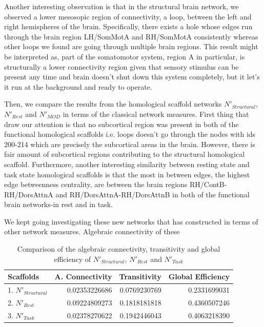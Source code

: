 \documentclass[9pt,twocolumn,twoside,lineno]{pnas-new}
\begin{document}
Another interesting observation is that in the structural brain network, we observed a lower mesosopic region of connectivity, a loop, between the left and right hemispheres of the brain. Specifically, there exists a hole whose edges run through the brain region LH/SomMotA and RH/SomMotA consistently whereas other loops we found are going through multiple brain regions. This result might be interpreted as, part of the somatomotor system, region A in particular, is structurally a lower connectivity region given that sensory stimulus can be present any time and brain doesn't shut down this system completely, but it let's it run at the background and ready to operate.

Then, we compare the results from the homological scaffold networks $N'_{Structural}$, $N'_{Rest}$ and $N'_{MOD}$ in terms of the classical network measures. First thing that draw our attention is that no subcortical region was present in both of the functional homological scaffolds i.e. loops doesn't go through the nodes with ids 200-214 which are precisely the subcortical areas  in the brain. However, there is fair amount of subcortical regions contributing to the structural homological scaffold. Furthermore, another interesting similarity between resting state and task state homological scaffolds is that the most in between edges, the highest edge betweenness centrality, are between the brain regions RH/ContB-RH/DorsAttnA and RH/DorsAttnA-RH/DorsAttnB in both of the functional brain networks-in rest and in task. 

We kept going investigating these new networks that has constructed in terms of other network measures. Algebraic connectivity of these 
\begin{table}%
\centering
\caption{Comparison of the algebraic connectivity, transitivity and global efficiency of $N'_{Structural}$, $N'_{Rest}$ and $N'_{Task}$}
\begin{tabular}{lrrr}
Scaffolds & A. Connectivity & Transitivity & Global Efficiency \\
\midrule
1. $N'_{Structural}$ & 0.02353226686 & 0.0769230769 & 0.2331699031 \\
2. $N'_{Rest}$ & 0.09224809273 & 0.1818181818 & 0.4360507246 \\
3. $N'_{Task}$ & 0.02378270622 & 0.1942446043 & 0.4063218390\\
\bottomrule
\end{tabular}

\end{table}
\end{document}
